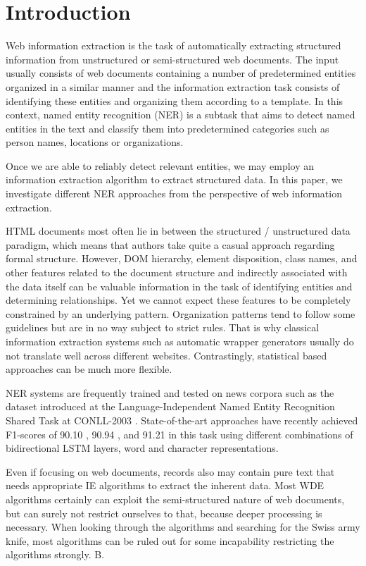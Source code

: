 \documentclass[sigconf]{acmart}
\begin{document}
\section{Introduction}

Web information extraction is the task of automatically extracting structured information
from unstructured or semi-structured web documents. The input usually consists of
web documents containing a number of predetermined entities organized in a similar 
manner and the information extraction task consists of identifying these entities
and organizing them according to a template. In this context, named entity recognition
(NER) is a subtask that aims to detect named entities in the text and classify them into 
predetermined categories such as person names, locations or organizations. 

Once we are able
to reliably detect relevant entities, we may employ an information extraction 
algorithm to extract structured data. In this paper, we investigate different NER 
approaches from the perspective of web information extraction.

HTML documents most often lie in between the structured / unstructured data paradigm, 
which means that authors take quite a casual approach regarding formal structure. 
However, DOM hierarchy, element disposition, class names, and other features related to 
the document structure and indirectly associated with the data itself can be valuable 
information in the task of identifying entities and determining relationships. Yet we 
cannot expect these features to be completely constrained by an underlying pattern. 
Organization patterns tend to follow some guidelines but are in no way subject to 
strict rules. That is why classical information extraction systems such as automatic
wrapper generators usually do not translate well across different websites. Contrastingly, 
statistical based approaches can be much more flexible.

NER systems are frequently trained and tested on news corpora such as the 
dataset introduced at the Language-Independent Named Entity Recognition Shared Task
at CONLL-2003 \cite{Sang2003}. State-of-the-art approaches have recently achieved 
F1-scores of 90.10 \cite{Huang2015}, 90.94 \cite{Lample2016}, and 91.21 \cite{Ma2016} 
in this task using different combinations of bidirectional LSTM layers, word and 
character representations. 

Even if focusing on web documents, records also may
contain pure text that needs appropriate IE algorithms to extract the inherent data. Most WDE algorithms certainly can exploit the semi-structured nature of web documents, but can surely not restrict ourselves to that, because deeper processing is necessary. When looking through the algorithms and searching for the Swiss army knife, most algorithms can be ruled out for some incapability restricting the algorithms strongly. B.
\end{document}
